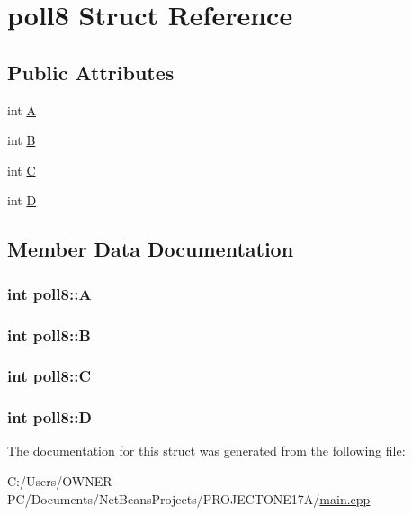 \hypertarget{structpoll8}{\section{poll8 Struct Reference}
\label{structpoll8}
}
\subsection*{Public Attributes}
\begin{DoxyCompactItemize}
\item 
int \hyperlink{structpoll8_a5dcd382b9833dc2576fbff1706307d84}{A}
\item 
int \hyperlink{structpoll8_a955f7500e8ad2d6fb2e2a5a5799afebb}{B}
\item 
int \hyperlink{structpoll8_a9305fbbb3c0894d4c3429293cc793694}{C}
\item 
int \hyperlink{structpoll8_a9c91261d92e223b6ccdbac4a7cc25f4d}{D}
\end{DoxyCompactItemize}


\subsection{Member Data Documentation}
\hypertarget{structpoll8_a5dcd382b9833dc2576fbff1706307d84}{
\subsubsection[{A}]{\setlength{\rightskip}{0pt plus 5cm}int poll8\+::\+A}}\label{structpoll8_a5dcd382b9833dc2576fbff1706307d84}
\hypertarget{structpoll8_a955f7500e8ad2d6fb2e2a5a5799afebb}{
\subsubsection[{B}]{\setlength{\rightskip}{0pt plus 5cm}int poll8\+::\+B}}\label{structpoll8_a955f7500e8ad2d6fb2e2a5a5799afebb}
\hypertarget{structpoll8_a9305fbbb3c0894d4c3429293cc793694}{
\subsubsection[{C}]{\setlength{\rightskip}{0pt plus 5cm}int poll8\+::\+C}}\label{structpoll8_a9305fbbb3c0894d4c3429293cc793694}
\hypertarget{structpoll8_a9c91261d92e223b6ccdbac4a7cc25f4d}{
\subsubsection[{D}]{\setlength{\rightskip}{0pt plus 5cm}int poll8\+::\+D}}\label{structpoll8_a9c91261d92e223b6ccdbac4a7cc25f4d}


The documentation for this struct was generated from the following file\+:\begin{DoxyCompactItemize}
\item 
C\+:/\+Users/\+O\+W\+N\+E\+R-\/\+P\+C/\+Documents/\+Net\+Beans\+Projects/\+P\+R\+O\+J\+E\+C\+T\+O\+N\+E17\+A/\hyperlink{main_8cpp}{main.\+cpp}\end{DoxyCompactItemize}
